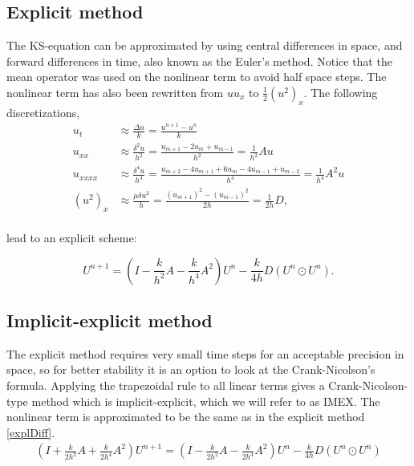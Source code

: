 \subsection{Explicit method}
The KS-equation can be approximated by using central differences in space, and forward differences in time, also known as the Euler's method. Notice that the mean operator was used on the nonlinear term to avoid half space steps.    The nonlinear term has also been rewritten from $uu_x$ to $\frac{1}{2}(u^2)_x$. The following discretizations,
\begin{equation*}
\begin{aligned}
u_t &\approx \frac{\Delta u}{k} = \frac{u^{n+1}-u^n}{k} \\
u_{xx} &\approx \frac{\delta^2 u}{h^2} = \frac{u_{m+1}-2u_{m}+u_{m-1}}{h^2} = \frac{1}{h^2}Au \\
u_{xxxx} &\approx \frac{\delta^4 u}{h^4} = \frac{u_{m+2}-4u_{m+1}+6u_m-4u_{m-1}+u_{m-2}}{h^4} = \frac{1}{h^4}A^2u\\
(u^2)_{x} &\approx \frac{\mu \delta u^2}{h} = \frac{(u_{m+1})^2-(u_{m-1})^2}{2h} = \frac{1}{2h}D,\\
\end{aligned}
\end{equation*}

lead to an explicit scheme:

\begin{equation}
\label{explDiff}
U^{n+1} = (I - \frac{k}{h^2}A - \frac{k}{h^4}A^2)U^n - \frac{k}{4h}D(U^{n}\odot U^n).
\end{equation}

\subsection{Implicit-explicit method}
The explicit method requires very small time steps for an acceptable precision in space, so for better stability it is an option to look at the Crank-Nicolson's formula. Applying the trapezoidal rule to all linear terms gives a Crank-Nicolson-type method which is implicit-explicit, which we will refer to as IMEX. The nonlinear term is approximated to be the same as in the explicit method \eqref{explDiff}.
\begin{align}
\label{implDiff}
(I + \frac{k}{2h^2}A + \frac{k}{2h^4}A^2)U^{n+1}
= (I - \frac{k}{2h^2}A - \frac{k}{2h^4}A^2)U^n - \frac{k}{4h}D(U^{n}\odot U^n)
\end{align}


